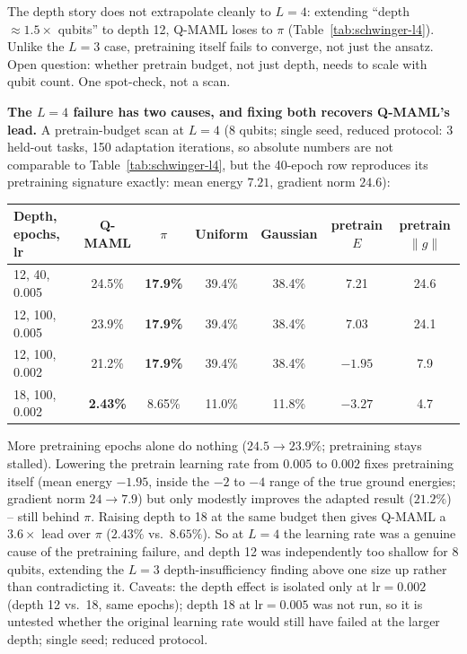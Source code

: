 \documentclass[11pt]{article}
\begin{document}
The depth story does not extrapolate cleanly to $L{=}4$: extending ``depth $\approx1.5\times$ qubits'' to
depth 12, Q-MAML loses to $\pi$ (Table~\ref{tab:schwinger-l4}). Unlike the $L{=}3$ case, pretraining itself
fails to converge, not just the ansatz. Open question: whether pretrain budget, not just depth, needs to
scale with qubit count. One spot-check, not a scan.

\begin{keyresult}
\textbf{The $L{=}4$ failure has two causes, and fixing both recovers Q-MAML's lead.} A pretrain-budget scan
at $L{=}4$ (8 qubits; single seed, reduced protocol: 3 held-out tasks, 150 adaptation iterations, so absolute
numbers are not comparable to Table~\ref{tab:schwinger-l4}, but the 40-epoch row reproduces its pretraining
signature exactly: mean energy $7.21$, gradient norm $24.6$):

\begin{center}
\label{tab:schwinger-l4-scan}
\begin{tabular}{lcccccc}
\toprule
Depth, epochs, lr & Q-MAML & $\pi$ & Uniform & Gaussian & pretrain $E$ & pretrain $\|g\|$ \\
\midrule
12, 40, 0.005 & 24.5\% & \textbf{17.9\%} & 39.4\% & 38.4\% & 7.21 & 24.6 \\
12, 100, 0.005 & 23.9\% & \textbf{17.9\%} & 39.4\% & 38.4\% & 7.03 & 24.1 \\
12, 100, 0.002 & 21.2\% & \textbf{17.9\%} & 39.4\% & 38.4\% & $-1.95$ & 7.9 \\
18, 100, 0.002 & \textbf{2.43\%} & 8.65\% & 11.0\% & 11.8\% & $-3.27$ & 4.7 \\
\bottomrule
\end{tabular}
\end{center}

More pretraining epochs alone do nothing ($24.5\to23.9\%$; pretraining stays stalled). Lowering the
pretrain learning rate from $0.005$ to $0.002$ fixes pretraining itself (mean energy $-1.95$, inside the
$-2$ to $-4$ range of the true ground energies; gradient norm $24\to7.9$) but only modestly improves the
adapted result ($21.2\%$) -- still behind $\pi$. Raising depth to 18 at the same budget then gives Q-MAML a
$3.6\times$ lead over $\pi$ ($2.43\%$ vs.\ $8.65\%$). So at $L{=}4$ the learning rate was a genuine cause of
the pretraining failure, and depth 12 was independently too shallow for 8 qubits, extending the $L{=}3$
depth-insufficiency finding above one size up rather than contradicting it. Caveats: the depth effect is
isolated only at $\text{lr}=0.002$ (depth 12 vs.\ 18, same epochs); depth 18 at $\text{lr}=0.005$ was not
run, so it is untested whether the original learning rate would still have failed at the larger depth;
single seed; reduced protocol.
\end{keyresult}
\end{document}

